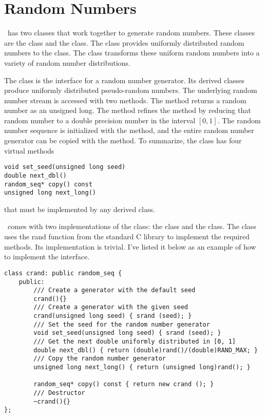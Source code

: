 \chapter{Random Numbers}
\adevs\ has two classes that work together to generate random numbers. These classes are the  class and the  class. The  class provides uniformly distributed random numbers to the  class. The  class transforms these uniform random numbers into a variety of random number distributions.

The  class is the interface for a random number generator. Its derived classes produce uniformly distributed pseudo-random numbers. The underlying random number stream is accessed with two methods. The method  returns a random number as an unsigned long. The method  refines the  method by reducing that random number to a double precision number in the interval $[0,1]$. The random number sequence is initialized with the  method, and the entire random number generator can be copied with the  method. To summarize, the  class has four virtual methods
\begin{verbatim}
void set_seed(unsigned long seed) 
double next_dbl() 
random_seq* copy() const 
unsigned long next_long() 
\end{verbatim}
that must be implemented by any derived class.

\adevs\ comes with two implementations of the  class: the  class and the  class. The  class uses the rand function from the standard C library to implement the required methods. Its implementation is trivial. I've listed it below as an example of how to implement the  interface.
\begin{verbatim}
class crand: public random_seq {
    public:
        /// Create a generator with the default seed
        crand(){}
        /// Create a generator with the given seed
        crand(unsigned long seed) { srand (seed); }
        /// Set the seed for the random number generator
        void set_seed(unsigned long seed) { srand (seed); }
        /// Get the next double uniformly distributed in [0, 1]
        double next_dbl() { return (double)rand()/(double)RAND_MAX; } 
        /// Copy the random number generator
        unsigned long next_long() { return (unsigned long)rand(); }

        random_seq* copy() const { return new crand (); }
        /// Destructor
        ~crand(){}
};
\end{verbatim}

